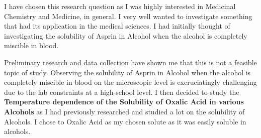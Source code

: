 {I have chosen this research question as I was highly interested in Medicinal Chemistry and Medicine, in general. I very well wanted to investigate something that had its application in the medical sciences. I had initially thought of investigating the solubility of Asprin in Alcohol when the alcohol is completely miscible in blood.}

{Preliminary research and data collection have shown me that this is not a feasible topic of study. Observing the solubility of Asprin in Alcohol when the alcohol is completely miscible in blood on the microscopic level is excruciatingly challenging due to the lab constraints at a high-school level. I then decided to study the \textbf{Temperature dependence of the Solubility of Oxalic Acid in various Alcohols} as I had previously researched and studied a lot on the solubility of Alcohols. I chose to Oxalic Acid as my chosen solute as it was easily soluble in alcohols.}

